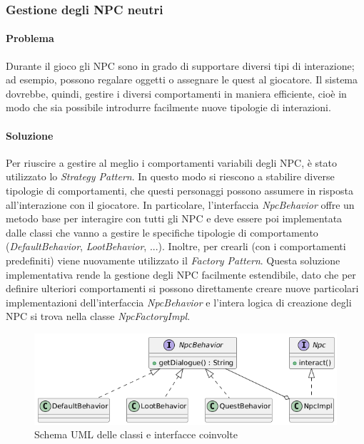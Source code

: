 \documentclass[a4paper,12pt]{report}
\begin{document}
\subsubsection{Gestione degli NPC neutri}
\paragraph{Problema} Durante il gioco gli NPC sono in grado di supportare diversi tipi di interazione; ad esempio, possono regalare oggetti o assegnare le quest al giocatore.
Il sistema dovrebbe, quindi, gestire i diversi comportamenti in maniera efficiente, cioè in modo che sia possibile introdurre facilmente nuove tipologie di interazioni.
\paragraph{Soluzione} Per riuscire a gestire al meglio i comportamenti variabili degli NPC, è stato utilizzato lo \textit{Strategy Pattern}.
In questo modo si riescono a stabilire diverse tipologie di comportamenti, che questi personaggi possono assumere in risposta all'interazione con il giocatore.
In particolare, l'interfaccia \textit{NpcBehavior} offre un metodo base per interagire con tutti gli NPC e deve essere poi implementata dalle classi che vanno a gestire 
le specifiche tipologie di comportamento (\textit{DefaultBehavior}, \textit{LootBehavior}, ...).\newline
Inoltre, per crearli (con i comportamenti predefiniti) viene nuovamente utilizzato il \textit{Factory Pattern}.\newline
Questa soluzione implementativa rende la gestione degli NPC facilmente estendibile, dato che per definire ulteriori comportamenti si possono direttamente 
creare nuove particolari implementazioni dell'interfaccia \textit{NpcBehavior} e l'intera logica di creazione degli NPC si trova nella classe \textit{NpcFactoryImpl}.\newline

\begin{figure}[H]
	\centering
	\includegraphics[width=\textwidth]{img/NpcUML.png}
	\caption{Schema UML delle classi e interfacce coinvolte}
	\label{img:NpcUML}
\end{figure}
\end{document}
